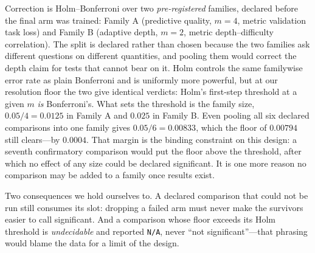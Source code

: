 Correction is Holm--Bonferroni over two \emph{pre-registered} families, declared
before the final arm was trained: Family A (predictive quality, $m=4$, metric
validation task loss) and Family B (adaptive depth, $m=2$, metric depth--difficulty
correlation). The split is declared rather than chosen because the two families ask
different questions on different quantities, and pooling them would correct the
depth claim for tests that cannot bear on it. Holm controls the same familywise
error rate as plain Bonferroni and is uniformly more powerful, but at our
resolution floor the two give identical verdicts: Holm's first-step threshold at a
given $m$ \emph{is} Bonferroni's. What sets the threshold is the family size,
$0.05/4 = 0.0125$ in Family A and $0.025$ in Family B. Even pooling all six declared
comparisons into one family gives $0.05/6 = 0.00833$, which the floor of $0.00794$
still clears---by $0.0004$. That margin is the binding constraint on this design: a
seventh confirmatory comparison would put the floor above the threshold, after
which no effect of any size could be declared significant. It is one more reason
no comparison may be added to a family once results exist.

Two consequences we hold ourselves to. A declared comparison that could not be run
still consumes its slot: dropping a failed arm must never make the survivors easier
to call significant. And a comparison whose floor exceeds its Holm threshold is
\emph{undecidable} and reported \texttt{N/A}, never ``not significant''---that
phrasing would blame the data for a limit of the design.

